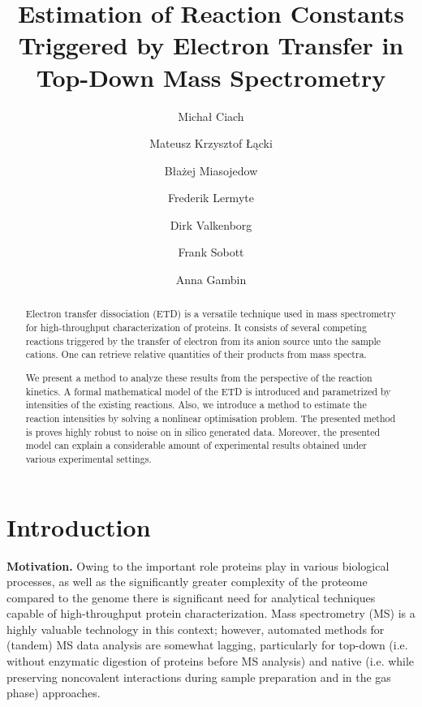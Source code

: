 \documentclass{llncs}
\begin{document}
\pagestyle{plain}
\title{Estimation of Reaction Constants Triggered by Electron Transfer in Top-Down Mass Spectrometry}
\author{Michał Ciach \and Mateusz Krzysztof Łącki \and Błażej Miasojedow \and Frederik Lermyte \and Dirk Valkenborg \and Frank Sobott \and Anna Gambin }



\maketitle
\begin{abstract}
Electron transfer dissociation (ETD) is a versatile technique used in mass spectrometry for high-throughput characterization of proteins. It consists of several competing reactions triggered by the transfer of electron from its anion source unto the sample cations. One can retrieve relative quantities of their products from mass spectra.

We present a method to analyze these results from the perspective of the reaction kinetics. A formal mathematical model of the ETD is introduced and parametrized by intensities of the existing reactions. Also, we introduce a method to estimate the reaction intensities by solving a nonlinear optimisation problem. The presented method is proves highly robust to noise on in silico generated data. Moreover, the presented model can explain a considerable amount of experimental results obtained under various experimental settings.
\end{abstract}

\section{Introduction}
\textbf{Motivation.}
Owing to the important role proteins play in various biological processes, as well as the significantly greater complexity of the proteome compared to the genome \cite{Smith2013-km} there is significant need for analytical techniques capable of high-throughput protein characterization. Mass spectrometry (MS) is a highly valuable technology in this context; however, automated methods for (tandem) MS data analysis are somewhat lagging, particularly for top-down (i.e. without enzymatic digestion of proteins before MS analysis) and native (i.e. while preserving noncovalent interactions during sample preparation and in the gas phase) approaches.
\end{document}
